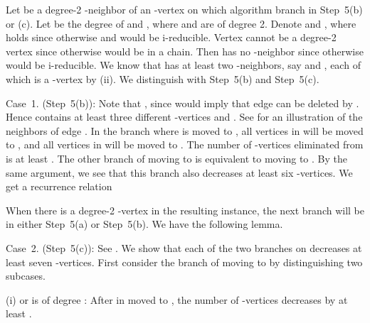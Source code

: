 \documentclass{elsart_TR2}
\begin{document}
Let  be  a degree-2 -neighbor  of an -vertex 
on which algorithm  branch in Step~5(b) or (c).
Let   be the degree of  and , where  and  are of degree 2.
Denote  and , where  holds
since otherwise  and  would be i-reducible.
 Vertex  cannot be a degree-2 vertex since otherwise  would be in a chain.
Then   has no -neighbor since otherwise  would be i-reducible.
 We know that  has at least two  -neighbors, say   and , each of which
 is a -vertex by (ii).
We distinguish with Step~5(b) and Step~5(c).




Case~1.  (Step~5(b)):
Note that , since   would imply
that  edge  can be deleted by .
Hence  contains at least three different -vertices  and .
See  for an illustration of  the neighbors of edge .
In the branch where  is moved to ,   all vertices in  will be moved to ,
 and all vertices in   will be moved to .
The number of  -vertices  eliminated from  is at least .
The other branch of moving  to  is equivalent to moving  to .
By the same argument, we see that this branch  also decreases at least six -vertices.
We get a recurrence relation

\vspace{-0mm}\vspace{-0mm}

When there is a degree-2 -vertex   in the resulting instance,
 the next branch will be in either Step~5(a) or Step~5(b). We have the following lemma.



Case~2.  (Step~5(c)): See .
We show that each of the two branches on   decreases at least seven -vertices.
First consider  the branch of moving  to  by distinguishing two subcases.

(i)  or  is of degree :
After  in moved to , the number of -vertices decreases by at least
.
\end{document}
